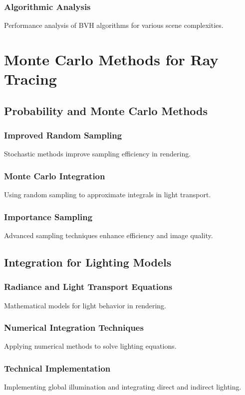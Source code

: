 \documentclass[12pt]{article}
\begin{document}
\subsubsection{Algorithmic Analysis}
Performance analysis of BVH algorithms for various scene complexities.

\section{Monte Carlo Methods for Ray Tracing}
\label{sec:monte-carlo}

\subsection{Probability and Monte Carlo Methods}
\subsubsection{Improved Random Sampling}
Stochastic methods improve sampling efficiency in rendering.

\subsubsection{Monte Carlo Integration}
Using random sampling to approximate integrals in light transport.

\subsubsection{Importance Sampling}
Advanced sampling techniques enhance efficiency and image quality.

\subsection{Integration for Lighting Models}
\subsubsection{Radiance and Light Transport Equations}
Mathematical models for light behavior in rendering.

\subsubsection{Numerical Integration Techniques}
Applying numerical methods to solve lighting equations.

\subsubsection{Technical Implementation}
Implementing global illumination and integrating direct and indirect lighting.
\end{document}
